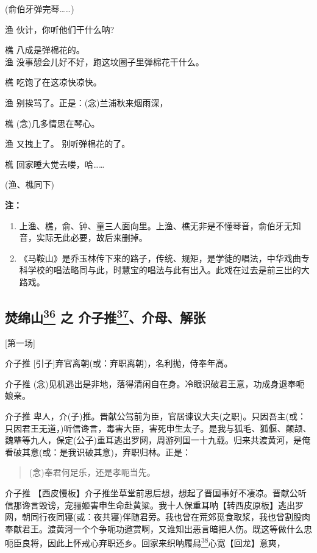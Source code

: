 (俞伯牙弹完琴\ldots{}\ldots{})

渔 伙计，你听他们干什么呐?

樵 八成是弹棉花的。\\
渔 没事憩会儿好不好，跑这坟圈子里弹棉花干什么。

樵 吃饱了在这凉快凉快。

渔 别挨骂了。正是：(念)兰浦秋来烟雨深，

樵 (念)几多情思在琴心。

渔 又拽上了。 别听弹棉花的了。

樵 回家睡大觉去喽，哈\ldots{}\ldots{}

(渔、樵同下)

\textbf{注：}

\begin{enumerate}
\def\labelenumi{\arabic{enumi}.}
\item
  上渔、樵，俞、钟、童三人面向里。上渔、樵无非是不懂琴音，俞伯牙无知音，实际无此必要，故后来删掉。
\item
  《马鞍山》是乔玉林传下来的路子，传统、规矩，是学徒的唱法，中华戏曲专科学校的唱法略同与此，时慧宝的唱法与此有出入。此戏在过去是前三出的大路戏。
\end{enumerate}

\newpage
\hypertarget{ux711aux7ef5ux5c71-ux4e4b-ux4ecbux5b50ux63a8ux4ecbux6bcdux89e3ux5f20}{%
\subsection{\texorpdfstring{焚绵山\protect\hyperlink{fn36}{\textsuperscript{36}}
之
介子推\protect\hyperlink{fn37}{\textsuperscript{37}}、介母、解张}{焚绵山36 之 介子推37、介母、解张}}\label{ux711aux7ef5ux5c71-ux4e4b-ux4ecbux5b50ux63a8ux4ecbux6bcdux89e3ux5f20}}

{[}第一场{]}

介子推 {[}引子{]}弃官离朝(或：弃职离朝)，名利抛，侍奉年高。

介子推
(念)见机逃出是非地，落得清闲自在身。冷眼识破君王意，功成身退奉呃娘亲。

介子推
卑人，介(子)推。晋献公驾前为臣，官居谏议大夫(之职)。只因吾主(或：只因君王无道，)听信谗言，毒害大臣，害死申生太子。是我与狐毛、狐偃、颠颉、魏犨等九人，保定(公子)重耳逃出罗网，周游列国一十九载。归来共渡黄河，是俺看破其意(或：是我识破其意)，弃职归林。正是：

\begin{quote}
(念)奉君何足乐，还是孝呃当先。
\end{quote}

介子推
【西皮慢板】介子推坐草堂前思后想，想起了晋国事好不凄凉。晋献公听信那谗言毁谤，宠骊姬害申生命赴黄粱。我十人保重耳呐【转西皮原板】逃出罗网，朝同行夜同寝(或：夜共寝)伴随君旁。我也曾在荒郊觅食取浆，我也曾割股肉奉献君王。渡黄河一个个争呃功邀赏啊，又谁知出恶言暗把人伤。既这等做什么忠呃臣良将，因此上怀戒心弃职还乡。回家来织呐履舄\protect\hyperlink{fn38}{\textsuperscript{38}}心宽【回龙】意爽，

